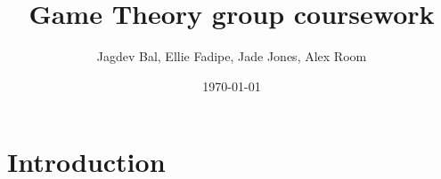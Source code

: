 \documentclass{article}
\title{Game Theory group coursework}
\author{Jagdev Bal, Ellie Fadipe, Jade Jones, Alex Room}
\date{\today}
\begin{document}
\maketitle

\section{Introduction}




\end{document}
